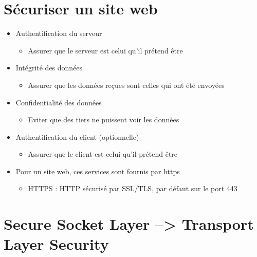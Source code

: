\hypertarget{suxe9curiser-un-site-web}{%
\section{Sécuriser un site web}\label{suxe9curiser-un-site-web}}

\begin{itemize}
\tightlist
\item
  Authentification du serveur

  \begin{itemize}
  \tightlist
  \item
    Assurer que le serveur est celui qu'il prétend être
  \end{itemize}
\item
  Intégrité des données

  \begin{itemize}
  \tightlist
  \item
    Assurer que les données reçues sont celles qui ont été envoyées
  \end{itemize}
\item
  Confidentialité des données

  \begin{itemize}
  \tightlist
  \item
    Eviter que des tiers ne puissent voir les données
  \end{itemize}
\item
  Authentification du client (optionnelle)

  \begin{itemize}
  \tightlist
  \item
    Assurer que le client est celui qu'il prétend être
  \end{itemize}
\item
  Pour un site web, ces services sont fournis par https

  \begin{itemize}
  \tightlist
  \item
    HTTPS : HTTP sécurisé par SSL/TLS, par défaut sur le port 443
  \end{itemize}
\end{itemize}

\hypertarget{secure-socket-layer-transport-layer-security}{%
\section{Secure Socket Layer --\textgreater{} Transport Layer
Security}\label{secure-socket-layer-transport-layer-security}}

